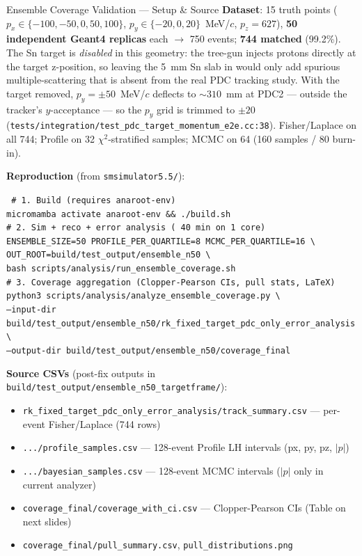 \documentclass[aspectratio=169]{beamer}
\begin{document}
\begin{frame}{Ensemble Coverage Validation --- Setup \& Source}
\small
\textbf{Dataset}: 15 truth points ($p_x \in \{-100,-50,0,50,100\}$, $p_y \in \{-20,0,20\}$~MeV/$c$, $p_z = 627$), \textbf{50 independent Geant4 replicas} each $\rightarrow$ 750 events; \textbf{744 matched} (99.2\%). The Sn target is \emph{disabled} in this geometry: the tree-gun injects protons directly at the target z-position, so leaving the 5~mm Sn slab in would only add spurious multiple-scattering that is absent from the real PDC tracking study. With the target removed, $p_y{=}\pm 50$~MeV/$c$ deflects to ${\sim}310$~mm at PDC2 --- outside the tracker's $y$-acceptance --- so the $p_y$ grid is trimmed to $\pm 20$ (\texttt{tests/integration/test\_pdc\_target\_momentum\_e2e.cc:38}). Fisher/Laplace on all 744; Profile on 32 $\chi^2$-stratified samples; MCMC on 64 (160 samples / 80 burn-in).

\textbf{Reproduction} (from \texttt{smsimulator5.5/}):
\begin{flushleft}\scriptsize\tt
\# 1. Build (requires anaroot-env)\\
micromamba activate anaroot-env \&\& ./build.sh\\[2pt]
\# 2. Sim + reco + error analysis (~40 min on 1 core)\\
ENSEMBLE\_SIZE=50 PROFILE\_PER\_QUARTILE=8 MCMC\_PER\_QUARTILE=16 \textbackslash\\
\phantom{xx}OUT\_ROOT=build/test\_output/ensemble\_n50 \textbackslash\\
\phantom{xx}bash scripts/analysis/run\_ensemble\_coverage.sh\\[2pt]
\# 3. Coverage aggregation (Clopper-Pearson CIs, pull stats, LaTeX)\\
python3 scripts/analysis/analyze\_ensemble\_coverage.py \textbackslash\\
\phantom{xx}--input-dir  build/test\_output/ensemble\_n50/rk\_fixed\_target\_pdc\_only\_error\_analysis \textbackslash\\
\phantom{xx}--output-dir build/test\_output/ensemble\_n50/coverage\_final
\end{flushleft}

\textbf{Source CSVs} (post-fix outputs in \texttt{build/test\_output/ensemble\_n50\_targetframe/}):
\begin{itemize}\setlength{\itemsep}{0pt}
\item \texttt{rk\_fixed\_target\_pdc\_only\_error\_analysis/track\_summary.csv} --- per-event Fisher/Laplace (744 rows)
\item \texttt{.../profile\_samples.csv} --- 128-event Profile LH intervals (px, py, pz, $|p|$)
\item \texttt{.../bayesian\_samples.csv} --- 128-event MCMC intervals ($|p|$ only in current analyzer)
\item \texttt{coverage\_final/coverage\_with\_ci.csv} --- Clopper-Pearson CIs (Table on next slides)
\item \texttt{coverage\_final/pull\_summary.csv}, \texttt{pull\_distributions.png}
\end{itemize}
\end{frame}
\end{document}

